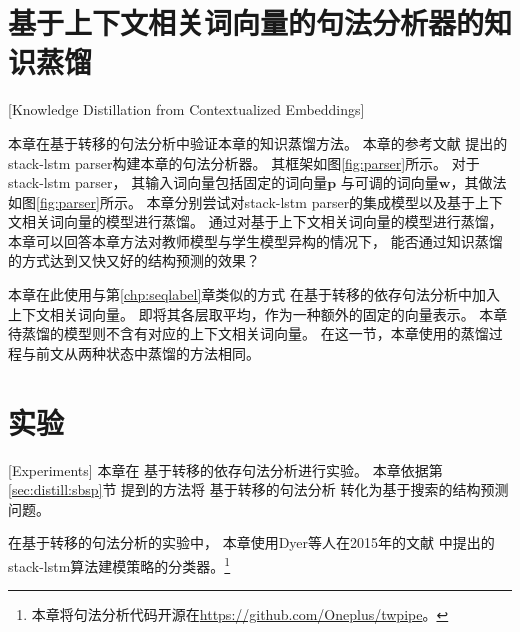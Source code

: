 \section{基于上下文相关词向量的句法分析器的知识蒸馏}[Knowledge Distillation from Contextualized Embeddings]

\begin{figure}[t]
	\centering
\end{figure}
本章在基于转移的句法分析中验证本章的知识蒸馏方法。
本章的参考文献
提出的stack-lstm parser构建本章的句法分析器。
其框架如图\ref{fig:parser}所示。
对于stack-lstm parser，
其输入词向量包括固定的词向量$\mathbf{p}$
与可调的词向量$\mathbf{w}$，其做法如图\ref{fig:parser}所示。
本章分别尝试对stack-lstm parser的集成模型以及基于上下文相关词向量的模型进行蒸馏。
通过对基于上下文相关词向量的模型进行蒸馏，
本章可以回答本章方法对教师模型与学生模型异构的情况下，
能否通过知识蒸馏的方式达到又快又好的结构预测的效果？

本章在此使用与第\ref{chp:seqlabel}章类似的方式
在基于转移的依存句法分析中加入上下文相关词向量。
即将其各层取平均，作为一种额外的固定的向量表示。
本章待蒸馏的模型则不含有对应的上下文相关词向量。
在这一节，本章使用的蒸馏过程与前文从两种状态中蒸馏的方法相同。

\section{实验}[Experiments]\label{sec:distill:vani-exp}
本章在
基于转移的依存句法分析进行实验。
本章依据第\ref{sec:distill:sbsp}节
提到的方法将
基于转移的句法分析
转化为基于搜索的结构预测问题。

在基于转移的句法分析的实验中，
本章使用Dyer等人在2015年的文献
中提出的stack-lstm算法建模策略的分类器。\footnote{本章将句法分析代码开源在\url{https://github.com/Oneplus/twpipe}。}

